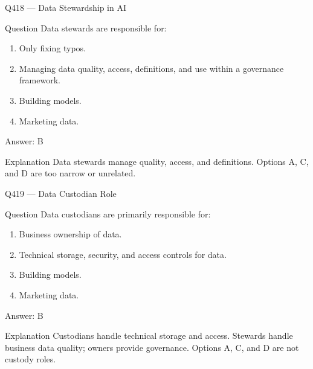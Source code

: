 \documentclass[aspectratio=169,8pt]{beamer}
\begin{document}
	\begin{frame}{Q418 --- Data Stewardship in AI}
		\begin{block}{Question}
			Data stewards are responsible for:
			\begin{enumerate}
				\item Only fixing typos.
				\item Managing data quality, access, definitions, and use within a governance framework.
				\item Building models.
				\item Marketing data.
			\end{enumerate}
		\end{block}
		\begin{exampleblock}{Answer: B}\end{exampleblock}
		\begin{block}{Explanation}
			Data stewards manage quality, access, and definitions. Options A, C, and D are too narrow or unrelated.
		\end{block}
	\end{frame}
	
	\begin{frame}{Q419 --- Data Custodian Role}
		\begin{block}{Question}
			Data custodians are primarily responsible for:
			\begin{enumerate}
				\item Business ownership of data.
				\item Technical storage, security, and access controls for data.
				\item Building models.
				\item Marketing data.
			\end{enumerate}
		\end{block}
		\begin{exampleblock}{Answer: B}\end{exampleblock}
		\begin{block}{Explanation}
			Custodians handle technical storage and access. Stewards handle business data quality; owners provide governance. Options A, C, and D are not custody roles.
		\end{block}
	\end{frame}
	
\end{document}
